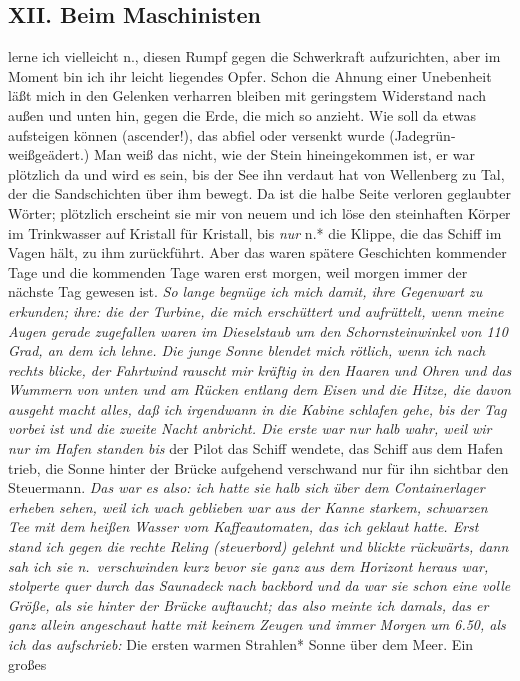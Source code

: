 \documentclass[
]{article}
\author{}
\date{\vspace{-2.5em}}
\begin{document}
\subsection{XII. Beim Maschinisten}\label{xii.-beim-maschinisten}

lerne ich vielleicht n., diesen Rumpf gegen die Schwerkraft
aufzurichten, aber im Moment bin ich ihr leicht liegendes Opfer. Schon
die Ahnung einer Unebenheit läßt mich in den Gelenken verharren bleiben
mit geringstem Widerstand nach außen und unten hin, gegen die Erde, die
mich so anzieht. Wie soll da etwas aufsteigen können (ascender!), das
abfiel oder versenkt wurde (Jadegrün-weißgeädert.) Man weiß das nicht,
wie der Stein hineingekommen ist, er war plötzlich da und wird es sein,
bis der See ihn verdaut hat von Wellenberg zu Tal, der die Sandschichten
über ihm bewegt. Da ist die halbe Seite verloren geglaubter Wörter;
plötzlich erscheint sie mir von neuem und ich löse den steinhaften
Körper im Trinkwasser auf Kristall für Kristall, bis \emph{nur }n.* die
Klippe, die das Schiff im Vagen hält, zu ihm zurückführt. Aber das waren
spätere Geschichten kommender Tage und die kommenden Tage waren erst
morgen, weil morgen immer der nächste Tag gewesen ist. \emph{So lange
begnüge ich mich damit, ihre Gegenwart zu erkunden; ihre: die der
Turbine, die mich erschüttert und aufrüttelt, wenn meine Augen gerade
zugefallen waren im Dieselstaub um den Schornsteinwinkel von 110 Grad,
an dem ich lehne. Die junge Sonne blendet mich rötlich, wenn ich nach
rechts blicke, der Fahrtwind rauscht mir kräftig in den Haaren und Ohren
und das Wummern von unten und am Rücken entlang dem Eisen und die Hitze,
die davon ausgeht macht alles, daß ich irgendwann in die Kabine schlafen
gehe, bis der Tag vorbei ist und die zweite Nacht anbricht. Die erste
war nur halb wahr, weil wir nur im Hafen standen bis }der Pilot das
Schiff wendete, das Schiff aus dem Hafen trieb, die Sonne hinter der
Brücke aufgehend verschwand nur für ihn sichtbar den Steuermann.
\emph{Das war es also: ich hatte sie halb sich über dem Containerlager
erheben sehen, weil ich wach geblieben war aus der Kanne starkem,
schwarzen Tee mit dem heißen Wasser vom Kaffeautomaten, das ich geklaut
hatte. Erst stand ich gegen die rechte Reling (steuerbord) gelehnt und
blickte rückwärts, dann sah ich sie n.~verschwinden kurz bevor sie ganz
aus dem Horizont heraus war, stolperte quer durch das Saunadeck nach
backbord und da war sie schon eine volle Größe, als sie hinter der
Brücke auftaucht; das also meinte ich damals, das er ganz allein
angeschaut hatte mit keinem Zeugen und immer Morgen um 6.50, als ich das
aufschrieb: }Die ersten warmen Strahlen* Sonne über dem Meer. Ein großes
\end{document}
